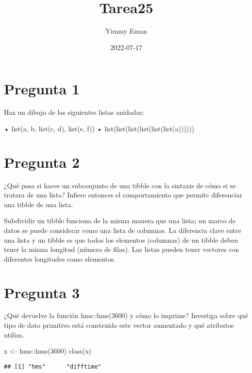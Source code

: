 \documentclass[
]{article}
\title{Tarea25}
\author{Yimmy Eman}
\date{2022-07-17}
\newenvironment{Shaded}{\begin{snugshade}}{\end{snugshade}}
\newcommand{\DecValTok}[1]{\textcolor[rgb]{0.00,0.00,0.81}{#1}}
\newcommand{\FunctionTok}[1]{\textcolor[rgb]{0.00,0.00,0.00}{#1}}
\newcommand{\NormalTok}[1]{#1}
\newcommand{\OtherTok}[1]{\textcolor[rgb]{0.56,0.35,0.01}{#1}}
\newcommand{\SpecialCharTok}[1]{\textcolor[rgb]{0.00,0.00,0.00}{#1}}
\begin{document}
\maketitle

\hypertarget{pregunta-1}{%
\section{Pregunta 1}\label{pregunta-1}}

Haz un dibujo de las siguientes listas anidadas:

• list(a, b, list(c, d), list(e, f)) •
list(list(list(list(list(list(a))))))

\hypertarget{pregunta-2}{%
\section{Pregunta 2}\label{pregunta-2}}

¿Qué pasa si haces un subconjunto de una tibble con la sintaxis de cómo
si se tratara de una lista? Infiere entonces el comportamiento que
permite diferenciar una tibble de una lista.

Subdividir un tibble funciona de la misma manera que una lista; un marco
de datos se puede considerar como una lista de columnas. La diferencia
clave entre una lista y un tibble es que todos los elementos (columnas)
de un tibble deben tener la misma longitud (número de filas). Las listas
pueden tener vectores con diferentes longitudes como elementos.

\hypertarget{pregunta-3}{%
\section{Pregunta 3}\label{pregunta-3}}

¿Qué devuelve la función hms::hms(3600) y cómo lo imprime? Investiga
sobre qué tipo de dato primitivo está construido este vector aumentado y
qué atributos utiliza.

\begin{Shaded}
\begin{Highlighting}[]
\NormalTok{x }\OtherTok{\textless{}{-}}\NormalTok{ hms}\SpecialCharTok{::}\FunctionTok{hms}\NormalTok{(}\DecValTok{3600}\NormalTok{)}
\FunctionTok{class}\NormalTok{(x)}
\end{Highlighting}
\end{Shaded}

\begin{verbatim}
## [1] "hms"      "difftime"
\end{verbatim}
\end{document}
